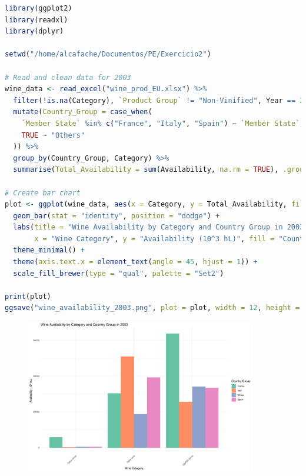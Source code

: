 \documentclass[11pt,a4paper]{article}
\begin{document}
\begin{lstlisting}[language=R]
library(ggplot2)
library(readxl)
library(dplyr)

setwd("/home/alcafache/Documentos/PE/Exercicio2")

# Read and clean data for 2003
wine_data <- read_excel("wine_prod_EU.xlsx") %>%
  filter(!is.na(Category), `Product Group` != "Non-Vinified", Year == 2003) %>%
  mutate(Country_Group = case_when(
    `Member State` %in% c("France", "Italy", "Spain") ~ `Member State`,
    TRUE ~ "Others"
  )) %>%
  group_by(Country_Group, Category) %>%
  summarise(Total_Availability = sum(Availability, na.rm = TRUE), .groups = 'drop')

# Create bar chart
plot <- ggplot(wine_data, aes(x = Category, y = Total_Availability, fill = Country_Group)) +
  geom_bar(stat = "identity", position = "dodge") +
  labs(title = "Wine Availability by Category and Country Group in 2003",
       x = "Wine Category", y = "Availability (10^3 hL)", fill = "Country Group") +
  theme_minimal() +
  theme(axis.text.x = element_text(angle = 45, hjust = 1)) +
  scale_fill_brewer(type = "qual", palette = "Set2")

print(plot)
ggsave("wine_availability_2003.png", plot = plot, width = 12, height = 8, dpi = 300)
\end{lstlisting}

\begin{figure}[htbp]
    \centering
    \includegraphics[width=0.9\textwidth]{wine_availability_2003.png}
\end{figure}
\end{document}
